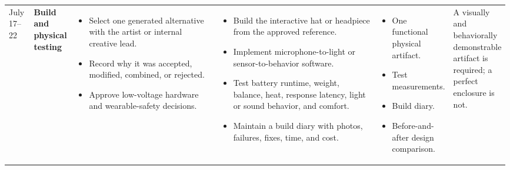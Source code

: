 \documentclass{article}
\begin{document}
\begin{landscape}
\begin{longtable}{
    L{0.05\linewidth}
    L{0.08\linewidth}
    L{0.3\linewidth}
    L{0.33\linewidth}
    L{0.15\linewidth}
    L{0.08\linewidth}
}
July 17--22
&
\textbf{Build and physical testing}
&
\begin{itemize}[leftmargin=*,nosep]
    \item Select one generated alternative with the artist or internal
    creative lead.
    \item Record why it was accepted, modified, combined, or rejected.
    \item Approve low-voltage hardware and wearable-safety decisions.
\end{itemize}
&
\begin{itemize}[leftmargin=*,nosep]
    \item Build the interactive hat or headpiece from the approved
    reference.
    \item Implement microphone-to-light or sensor-to-behavior software.
    \item Test battery runtime, weight, balance, heat,
    response latency, light or sound behavior, and comfort.
    \item Maintain a build diary with photos, failures, fixes,
    time, and cost.
\end{itemize}
&
\begin{itemize}[leftmargin=*,nosep]
    \item One functional physical artifact.
    \item Test measurements.
    \item Build diary.
    \item Before-and-after design comparison.
\end{itemize}
&
A visually and behaviorally demonstrable artifact is required;
a perfect enclosure is not.
\\


\end{longtable}
\end{landscape}
\end{document}
